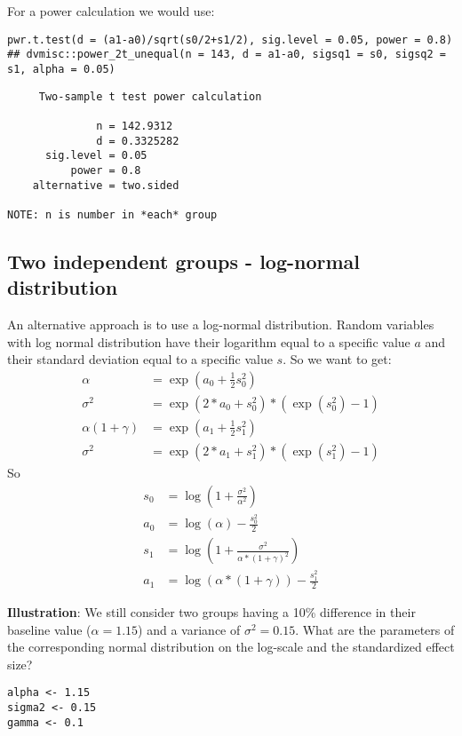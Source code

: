\documentclass[12pt]{article}
\begin{document}
For a power calculation we would use:
\lstset{language=r,label= ,caption= ,captionpos=b,numbers=none}
\begin{lstlisting}
pwr.t.test(d = (a1-a0)/sqrt(s0/2+s1/2), sig.level = 0.05, power = 0.8)
## dvmisc::power_2t_unequal(n = 143, d = a1-a0, sigsq1 = s0, sigsq2 = s1, alpha = 0.05)
\end{lstlisting}

\begin{verbatim}
     Two-sample t test power calculation 

              n = 142.9312
              d = 0.3325282
      sig.level = 0.05
          power = 0.8
    alternative = two.sided

NOTE: n is number in *each* group
\end{verbatim}

\subsection{Two independent groups - log-normal distribution}
\label{sec:orgaf63aae}

An alternative approach is to use a log-normal distribution. Random
variables with log normal distribution have their logarithm equal to a
specific value \(a\) and their standard deviation equal to a specific
value \(s\). So we want to get:
\begin{align*}
\alpha &= \exp(a_0 + \frac{1}{2} s_0^2) \\
\sigma^2 &= \exp(2*a_0 + s_0^2)*(\exp(s_0^2)-1) \\
\alpha (1+\gamma) &= \exp(a_1 + \frac{1}{2} s_1^2) \\
\sigma^2 &= \exp(2*a_1 + s_1^2)*(\exp(s_1^2)-1)
\end{align*}
So
\begin{align*}
s_0 &= \log\left(1+\frac{\sigma^2}{\alpha^2}\right)\\
a_0 &= \log(\alpha)-\frac{s_0^2}{2}\\
s_1 &= \log\left(1+\frac{\sigma^2}{\alpha*(1+\gamma)^2}\right)\\
a_1 &= \log(\alpha*(1+\gamma))-\frac{s_1^2}{2}
\end{align*}

\clearpage

\textbf{Illustration}: We still consider two groups having a 10\%
difference in their baseline value (\(\alpha=1.15\)) and a variance of
\(\sigma^2 = 0.15\). What are the parameters of the corresponding
normal distribution on the log-scale and the standardized effect size?
\lstset{language=r,label= ,caption= ,captionpos=b,numbers=none}
\begin{lstlisting}
alpha <- 1.15
sigma2 <- 0.15
gamma <- 0.1
\end{lstlisting}
\end{document}
